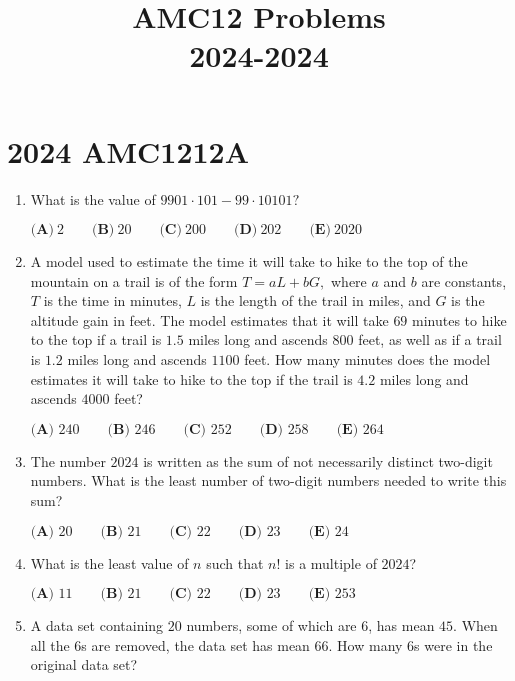 \documentclass{article}
\title{AMC12 Problems \\ 2024-2024}
\date{}
\begin{document}
\maketitle\thispagestyle{fancy}\tableofcontents\newpage\section*{2024 AMC1212A}\begin{enumerate}[label=\arabic*., itemsep=0.5em]\item What is the value of $9901\cdot101-99\cdot10101?$

$\textbf{(A)}~2\qquad\textbf{(B)}~20\qquad\textbf{(C)}~200\qquad\textbf{(D)}~202\qquad\textbf{(E)}~2020$\par \vspace{0.5em}\item A model used to estimate the time it will take to hike to the top of the mountain on a trail is of the form $T=aL+bG,$ where $a$ and $b$ are constants, $T$ is the time in minutes, $L$ is the length of the trail in miles, and $G$ is the altitude gain in feet. The model estimates that it will take $69$ minutes to hike to the top if a trail is $1.5$ miles long and ascends $800$ feet, as well as if a trail is $1.2$ miles long and ascends $1100$ feet. How many minutes does the model estimates it will take to hike to the top if the trail is $4.2$ miles long and ascends $4000$ feet?

$\textbf{(A) }240\qquad\textbf{(B) }246\qquad\textbf{(C) }252\qquad\textbf{(D) }258\qquad\textbf{(E) }264$\par \vspace{0.5em}\item The number $2024$ is written as the sum of not necessarily distinct two-digit numbers. What is the least number of two-digit numbers needed to write this sum?

$\textbf{(A) }20\qquad\textbf{(B) }21\qquad\textbf{(C) }22\qquad\textbf{(D) }23\qquad\textbf{(E) }24$\par \vspace{0.5em}\item What is the least value of $n$ such that $n!$ is a multiple of $2024$?

$
\textbf{(A) }11 \qquad
\textbf{(B) }21 \qquad
\textbf{(C) }22 \qquad
\textbf{(D) }23 \qquad
\textbf{(E) }253 \qquad
$\par \vspace{0.5em}\item A data set containing $20$ numbers, some of which are $6$, has mean $45$. When all the 6s are removed, the data set has mean $66$. How many 6s were in the original data set?


\end{enumerate}
\end{document}
